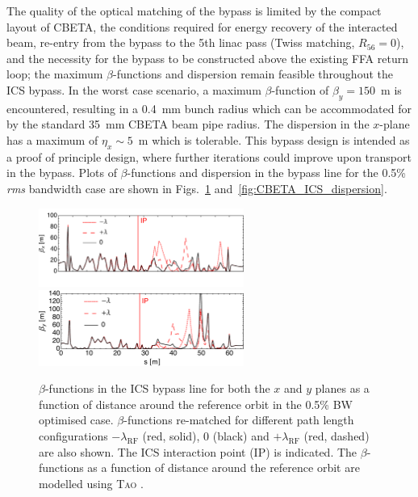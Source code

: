 \documentclass[../main.tex]{subfiles}
\begin{document}
The quality of the optical matching of the bypass is limited by the compact layout of CBETA, the conditions required for energy recovery of the interacted beam, re-entry from the bypass to the 5th linac pass (Twiss matching, $R_{56} =0$), and the necessity for the bypass to be constructed above the existing FFA return loop; the maximum $\beta$-functions and dispersion remain feasible throughout the ICS bypass. In the worst case scenario, a maximum $\beta$-function of $\beta_{y} = 150$~\si{\meter} is encountered, resulting in a 0.4~\si{\milli\meter} bunch radius which can be accommodated for by the standard 35~\si{\milli\meter} CBETA beam pipe radius. The dispersion in the $x$-plane has a maximum of $\eta_{x}\sim5$~\si{\meter} which is tolerable. This bypass design is intended as a proof of principle design, where further iterations could improve upon transport in the bypass. Plots of $\beta$-functions and dispersion in the bypass line for the 0.5\% \textit{rms} bandwidth case are shown in Figs.~\ref{fig:CBETA_ICS_Twiss} and~\ref{fig:CBETA_ICS_dispersion}. 
\begin{figure}[!h]
\centering
\includegraphics[width=0.6\textwidth]{Figures/CBETA_Inverse_Compton_Source_Design/twissplotx.pdf}
\includegraphics[width=0.6\textwidth]{Figures/CBETA_Inverse_Compton_Source_Design/twissploty.pdf}
\caption{$\beta$-functions in the ICS bypass line for both the $x$ and $y$ planes as a function of distance around the reference orbit in the 0.5\% BW optimised case. $\beta$-functions re-matched for different path length configurations $-\lambda_{\mathrm{RF}}$ (red, solid), $0$ (black) and $+\lambda_{\mathrm{RF}}$ (red, dashed) are also shown. The ICS interaction point (IP) is indicated. The $\beta$-functions as a function of distance around the reference orbit are modelled using \textsc{Tao} \cite{TaoManual}.}
\label{fig:CBETA_ICS_Twiss}
\end{figure}
\end{document}
